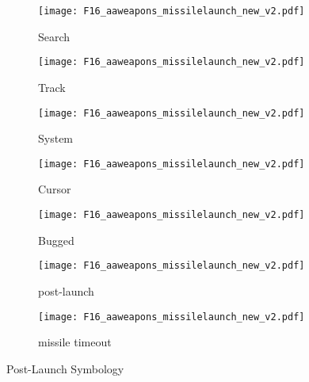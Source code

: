 \begin{figure}[htbp]
    \centering
    \begin{subfigure}[b]{0.15\linewidth}
        \centering
        \texttt{[image: F16\_aaweapons\_missilelaunch\_new\_v2.pdf]}
        \caption{Search}
    \end{subfigure}
    \begin{subfigure}[b]{0.15\linewidth}
        \centering
        \texttt{[image: F16\_aaweapons\_missilelaunch\_new\_v2.pdf]}
        \caption{Track}
    \end{subfigure}
    \begin{subfigure}[b]{0.15\linewidth}
        \centering
        \texttt{[image: F16\_aaweapons\_missilelaunch\_new\_v2.pdf]}
        \caption{System}
    \end{subfigure}
    \begin{subfigure}[b]{0.15\linewidth}
        \centering
        \texttt{[image: F16\_aaweapons\_missilelaunch\_new\_v2.pdf]}
        \caption{Cursor}
    \end{subfigure}
    \begin{subfigure}[b]{0.15\linewidth}
        \centering
        \texttt{[image: F16\_aaweapons\_missilelaunch\_new\_v2.pdf]}
        \caption{Bugged}
    \end{subfigure}
    \begin{subfigure}[b]{0.3\linewidth}
        \centering
        \texttt{[image: F16\_aaweapons\_missilelaunch\_new\_v2.pdf]}
        \caption{post-launch}
    \end{subfigure}
    \begin{subfigure}[b]{0.3\linewidth}
        \centering
        \texttt{[image: F16\_aaweapons\_missilelaunch\_new\_v2.pdf]}
        \caption{missile timeout}
    \end{subfigure}
    \caption{Post-Launch Symbology}
\end{figure}


\marginfigeometry

